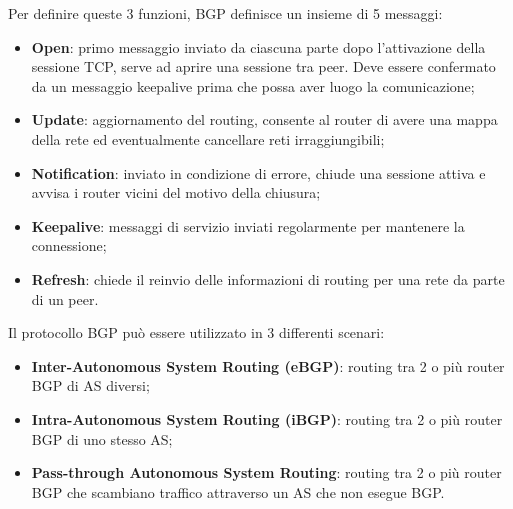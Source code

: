         Per definire queste 3 funzioni, BGP definisce un insieme di 5 messaggi:

            \begin{itemize}
                \item \textbf{Open}: primo messaggio inviato da ciascuna parte dopo l’attivazione della sessione TCP,
                serve ad aprire una sessione tra peer. Deve essere confermato da un messaggio
                keepalive prima che possa aver luogo la comunicazione;
                \item \textbf{Update}: aggiornamento del routing, consente al router di avere una mappa della rete ed
                eventualmente cancellare reti irraggiungibili;
                \item \textbf{Notification}: inviato in condizione di errore, chiude una sessione attiva e avvisa i router
                vicini del motivo della chiusura;
                \item \textbf{Keepalive}: messaggi di servizio inviati regolarmente per mantenere la connessione;
                \item \textbf{Refresh}: chiede il reinvio delle informazioni di routing per una rete da parte di un peer.
            \end{itemize}

                
        Il protocollo BGP può essere utilizzato in 3 differenti scenari:

            \begin{itemize}
                \item \textbf{Inter-Autonomous System Routing (eBGP)}: routing tra 2 o più router BGP di AS
                diversi;
                \item \textbf{Intra-Autonomous System Routing (iBGP)}: routing tra 2 o più router BGP di uno
                stesso AS;
                \item \textbf{Pass-through Autonomous System Routing}: routing tra 2 o più router BGP che
                scambiano traffico attraverso un AS che non esegue BGP.
            \end{itemize}